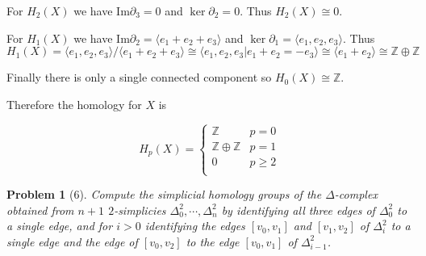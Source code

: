 \documentclass[10pt]{article}
\newcommand{\sk}{\vskip 10mm}
\newcommand{\bb}[1]{\mathbb{#1}}
\theoremstyle{plain}
\newtheorem{problem}{Problem}
\theoremstyle{remark}
\begin{document}
For $H_2(X)$ we have $\mathrm{Im}\partial_3=0$ and $\ker\partial_2=0$. Thus
$H_2(X)\cong 0$.

For $H_1(X)$ we have $\mathrm{Im}\partial_2=\langle e_1+e_2+e_3\rangle$ and $\ker\partial_1=\langle e_1,e_2,e_3\rangle$.
Thus
\[ H_1(X)=\langle e_1,e_2,e_3\rangle/\langle e_1+e_2+e_3\rangle\cong\langle e_1,e_2,e_3|e_1+e_2=-e_3\rangle\cong\langle e_1+e_2\rangle\cong\bb{Z}\oplus\bb{Z}\]

Finally there is only a single connected component so $H_0(X)\cong\bb{Z}$.

Therefore the homology for $X$ is

\[
  H_p(X)=
  \left\{
    \begin{array}{ll}
      \bb{Z} & p=0\\
      \bb{Z}\oplus\bb{Z} & p=1\\
      0 & p\geq 2\\
    \end{array}
  \right.
\]

\sk

\begin{problem}[6]
  Compute the simplicial homology groups of the $\Delta$-complex obtained
  from $n+1$ $2$-simplicies $\Delta^2_0, \cdots, \Delta^2_n$ by identifying
  all three edges of $\Delta^2_0$ to a single edge, and for $i>0$ identifying
  the edges $[v_0,v_1]$ and $[v_1,v_2]$ of $\Delta^2_i$ to a single edge and
  the edge of $[v_0,v_2]$ to the edge $[v_0,v_1]$ of $\Delta^2_{i-1}$.
\end{problem}

\sk

\end{document}
